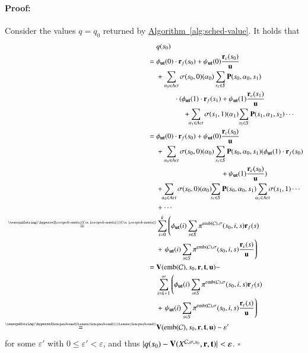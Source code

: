 \documentclass[10pt,twocolumn]{article}
\newenvironment{proof}{\paragraph{Proof:}}{\hfill$\square$}
\newcommand{\states} {{\ensuremath S}}
\newcommand{\state}  {{\ensuremath s}}
\newcommand{\sched}  {{\ensuremath {\sigma}}}
\newcommand{\acts}{\mathit{Act}}
\newcommand{\pmat}{\mathbf{P}}
\newcommand{\cmodel}{\mathcal{C}}
\newcommand{\urate}{\mathbf{u}}
\newcommand{\act}{\alpha}
\newcommand{\rew}{\mathbf{r}}
\newcommand{\frew}{\mathbf{r}_f}
\newcommand{\crew}{\mathbf{r}_c}
\newcommand{\timeb}{\mathbf{t}}
\newcommand{\mvalue}{\mathbf{V}}
\newcommand{\precision}{\varepsilon}
\newcommand{\emb}{\mathrm{emb}}
\newcommand{\stopro}{X}
\newcommand{\reflem}[1]{\texorpdfstring{\hyperref[lem:#1]{Lemma~\ref*{lem:#1}}}{Lemma~\ref*{lem:#1}}}
\newcommand{\refscor}[1]{\texorpdfstring{\hyperref[cor:#1]{Cor.~\ref*{cor:#1}}}{Cor. \ref*{cor:#1}}}
\newcommand{\refalg}[1]{\texorpdfstring{\hyperref[alg:#1]{Algorithm~\ref*{alg:#1}}}{Algorithm~\ref*{alg:#1}}}
\newcommand{\tprob}{\pi}
\begin{document}
\begin{proof}
Consider the values $q = q_0$ returned by \refalg{sched-value}.
It holds that
\begin{equation}
\begin{split}
  & q(s_0) \\
  = {} & \phi_{\urate \timeb}(0) \cdot \frew(\state_0) + \psi_{\urate \timeb}(0) \frac{\crew(\state_0)}{\urate} \\
  & + \sum_{\act_0 \in \acts} \sched(\state_0,0)(\act_0) \sum_{\state_1 \in \states} \pmat(\state_0, \act_0, \state_1) \\
  & ~~~~~~~~~~\cdot(\phi_{\urate \timeb}(1) \cdot \frew(\state_1) + \psi_{\urate \timeb}(1) \frac{\crew(\state_1)}{\urate} \\
  & ~~~~~~~~~~~~~~~ +\!\! \sum_{\act_1 \in \acts} \sched(\state_1,1)(\act_1)\! \sum_{\state_2 \in \states} \pmat(\state_1, \act_1, \state_2)\cdots \\
  = {} &  \phi_{\urate \timeb}(0) \cdot \frew(\state_0) + \psi_{\urate \timeb}(0) \frac{\crew(\state_0)}{\urate} \\
  & + \sum_{\act_0 \in \acts }\sched(\state_0,0)(\act_0) \sum_{\state_1 \in \states} \pmat(\state_0, \act_0, \state_1)( \phi_{\urate \timeb}(1) \cdot \frew(\state_0) \\
  & ~~~~~~~~~~~~~~~~~~~~~~~~~~~~~~~~~~~~+ \psi_{\urate \timeb}(1) \frac{\crew(\state_0)}{\urate}) \\
  & + \!\!\sum_{\act_0 \in \acts}\sched(\state_0,0)(\act_0)\!\! \sum_{\state_1 \in \states} \pmat(\state_0, \act_0, \state_1) \!\!\sum_{\act_1 \in \acts} \!\! \sched(\state_1, 1)\cdots \\
  & + \cdots \\
  \stackrel{\mbox{\tiny\refscor{tprob-matrix}}}{=} & \sum_{i=0}^k \left(\phi_{\urate \timeb}(i) \sum_{\state \in \states} \tprob^{\emb(\cmodel),\sched}(\state_0,
  i, \state) \frew(\state)\right. \\
  & + \left.\psi_{\urate \timeb}(i) \sum_{\state \in \states} \tprob^{\emb(\cmodel),\sched}(\state_0, i, \state)
    \frac{\crew(\state)}{\urate}\right) \\
  = {} &  \mvalue(\emb(\cmodel), \state_0, \rew, \timeb, \urate) - \\
  & \sum_{i=k+1}^\infty \left(\phi_{\urate \timeb}(i) \sum_{\state \in \states} \tprob^{\emb(\cmodel),\sched}(\state_0,
  i, \state) \frew(\state)\right. \\
  & + \left.\psi_{\urate \timeb}(i) \sum_{\state \in \states} \tprob^{\emb(\cmodel),\sched}(\state_0, i, \state)
    \frac{\crew(\state)}{\urate}\right) \\
  \stackrel{\mbox{\tiny\reflem{precbound}}}{=} &  \mvalue(\emb(\cmodel), \state_0, \rew, \timeb, \urate) - \precision'
\end{split}
\end{equation}
for some $\precision'$ with $0 \leq \precision' < \precision$, and thus $|q(\state_0) - \mvalue(\stopro^{\cmodel,\sched,\state_0}, \rew, \timeb) | < \precision$.
\end{proof}
\end{document}

